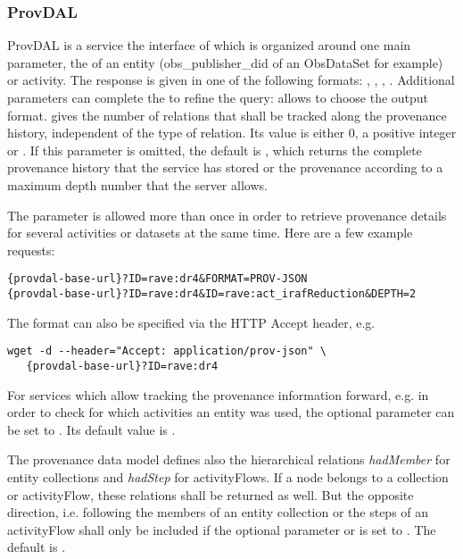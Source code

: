 \subsubsection{ProvDAL}
ProvDAL is a service the interface of which is organized around one main parameter, the  of an entity (obs\_publisher\_did of an ObsDataSet for example) or activity.
The response is given in one of the following formats: , , , .
Additional parameters can complete the  to refine the query:  allows to choose the output format.  gives the number of relations that shall be tracked along the provenance history, independent of the type of relation. Its value is either 0, a positive integer or . If this parameter is omitted, the default is , which returns the complete provenance history that the service has stored or the provenance according to a maximum depth number that the server allows.

The  parameter is allowed more than once in order to retrieve provenance details for several activities or datasets at the same time. Here are a few example requests:

\begin{verbatim}
{provdal-base-url}?ID=rave:dr4&FORMAT=PROV-JSON
{provdal-base-url}?ID=rave:dr4&ID=rave:act_irafReduction&DEPTH=2
\end{verbatim}

The format can also be specified via the HTTP Accept header, e.g.
\begin{verbatim}
wget -d --header="Accept: application/prov-json" \
   {provdal-base-url}?ID=rave:dr4
\end{verbatim}


For services which allow tracking the provenance information forward, e.g. in order to check for which activities an entity was used, the optional parameter  can be set to . Its default value is .

The provenance data model defines also the hierarchical relations \emph{hadMember} for entity collections and \emph{hadStep} for activityFlows. If a node belongs to a collection or activityFlow, these relations shall be returned as well. But the opposite direction, i.e. following the members of an entity collection or the steps of an activityFlow shall only be included if the optional parameter  or  is set to . The default is .

